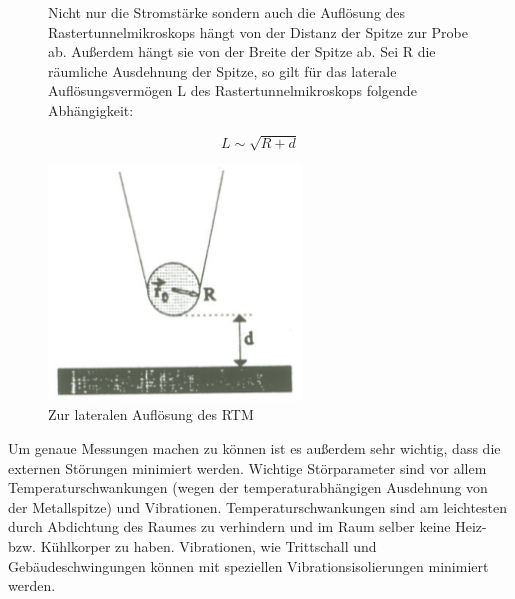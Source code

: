 \begin{figure}[H]
\begin{minipage}{0.5\textwidth}
Nicht nur die Stromstärke sondern auch die Auflösung des Rastertunnelmikroskops hängt von der Distanz der Spitze zur Probe ab. Außerdem hängt sie von der Breite der Spitze ab. Sei R die räumliche Ausdehnung der Spitze, so gilt für das laterale Auflösungsvermögen L des Rastertunnelmikroskops folgende Abhängigkeit:

$$ L \sim \sqrt{R+d} $$

\end{minipage}
\begin{minipage}{0.5\textwidth}
	\includegraphics[width=0.6\textwidth]{Bilder/auflsg.png}
	\centering \caption{Zur lateralen Auflösung des RTM}
\end{minipage}
\end{figure}

Um genaue Messungen machen zu können ist es außerdem sehr wichtig, dass die externen Störungen minimiert werden. Wichtige Störparameter sind vor allem Temperaturschwankungen (wegen der temperaturabhängigen Ausdehnung von der Metallspitze) und Vibrationen. Temperaturschwankungen sind am leichtesten durch Abdichtung des Raumes zu verhindern und im Raum selber keine Heiz- bzw. Kühlkorper zu haben. Vibrationen, wie Trittschall und Gebäudeschwingungen können mit speziellen Vibrationsisolierungen minimiert werden. 

\clearpage
